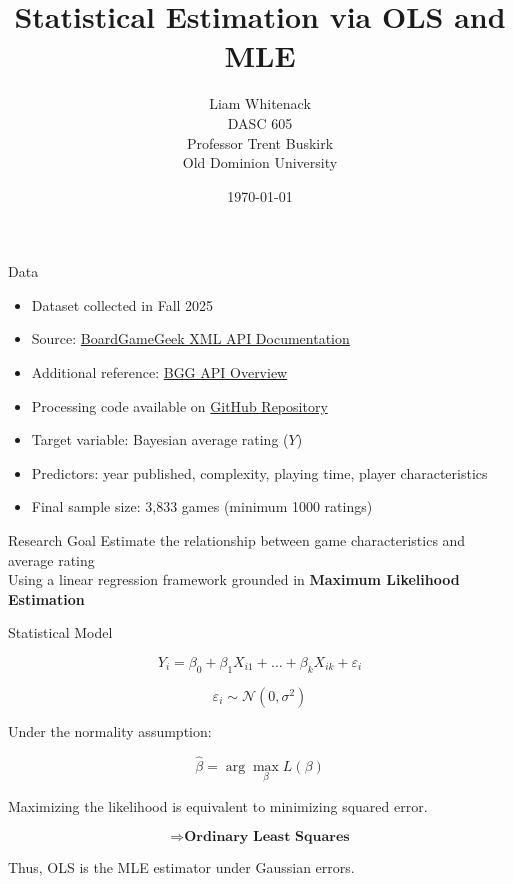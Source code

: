 \documentclass{beamer}
\title{Statistical Estimation via OLS and MLE}
\author{Liam Whitenack \\ 
DASC 605 \\ 
Professor Trent Buskirk \\ 
Old Dominion University}
\date{\today}
\begin{document}
\begin{frame}
\titlepage
\end{frame}

\begin{frame}{Data}
\small
\begin{itemize}
    \item Dataset collected in Fall 2025
    \item Source: \href{https://boardgamegeek.com/wiki/page/BGG_XML_API2}{BoardGameGeek XML API Documentation}
    \item Additional reference: 
    \href{https://boardgamegeek.com/wiki/page/BGG_XML_API?redirectedfrom=XML_API}{BGG API Overview}
    \item Processing code available on 
    \href{https://github.com/LiamWhitenack/board-game-geek.git}{GitHub Repository}
    \item Target variable: Bayesian average rating ($Y$)
    \item Predictors: year published, complexity, playing time, player characteristics
    \item Final sample size: 3,833 games (minimum 1000 ratings)
\end{itemize}
\end{frame}

\begin{frame}{Research Goal}
\centering
\Large
Estimate the relationship between game characteristics and average rating
\\[0.4cm]
Using a linear regression framework grounded in \textbf{Maximum Likelihood Estimation}
\end{frame}

\begin{frame}{Statistical Model}

\[
Y_i = \beta_0 + \beta_1 X_{i1} + \dots + \beta_k X_{ik} + \varepsilon_i
\]

\[
\varepsilon_i \sim \mathcal{N}(0, \sigma^2)
\]

\bigskip

Under the normality assumption:

\[
\hat{\beta} = \arg\max_{\beta} L(\beta)
\]

Maximizing the likelihood is equivalent to minimizing squared error.

\[
\Rightarrow \textbf{Ordinary Least Squares}
\]

Thus, OLS is the MLE estimator under Gaussian errors.
\end{frame}
\end{document}
